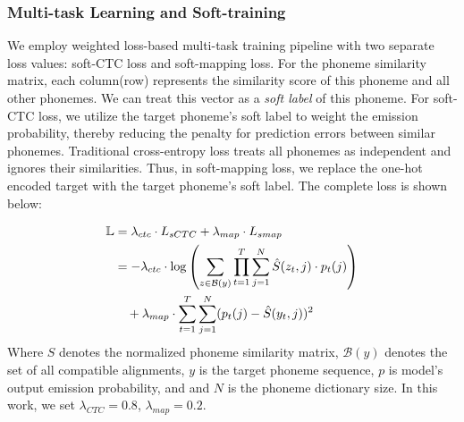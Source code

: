 \subsubsection{Multi-task Learning and Soft-training}
We employ weighted loss-based multi-task training pipeline with two separate loss values: soft-CTC loss and soft-mapping loss. 
For the phoneme similarity matrix, each column(row) represents the similarity score of this phoneme and all other phonemes. We can treat this vector as a \textit{soft label} of this phoneme.
For soft-CTC loss, we utilize the target phoneme's soft label to weight the emission probability, thereby reducing the penalty for prediction errors between similar phonemes.
Traditional cross-entropy loss treats all phonemes as independent and ignores their similarities. Thus, in soft-mapping loss, we replace the one-hot encoded target with the target phoneme's soft label.
The complete loss is shown below:

\vspace{-5pt}
\begin{align} \label{equation:multi-loss}
\mathbb{L} &= \lambda_{ctc} \cdot L_{sCTC} + \lambda_{map} \cdot L_{smap} \notag \\
&= -\lambda_{ctc} \cdot \log \left( \sum_{z \in \mathcal{B}(y)} \prod_{t=1}^{T} \sum_{j=1}^{N} \hat{S}(z_t, j) \cdot p_t(j) \right) \notag \\
&\quad +\lambda_{map} \cdot \sum_{t=1}^{T} \sum_{j=1}^{N} (p_{t}(j) - \hat{S}(y_t,j))^2
\end{align}
Where $S$ denotes the normalized phoneme similarity matrix, $\mathcal{B}(y)$ denotes the set of all compatible alignments, $y$ is the target phoneme sequence, $p$ is model's output emission probability, and and $N$ is the phoneme dictionary size. In this work, we set $\lambda_{CTC}=0.8$, $\lambda_{map}=0.2$.





